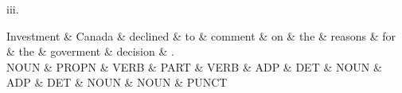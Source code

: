 iii. \\
\begin{center}
 {\small

 \begin{dependency}[] 
 \begin{deptext}
Investment \& Canada \& declined \& to \& comment \& on \& the \& reasons \& for \& the \& goverment \& decision \& . \\
NOUN \& PROPN \& VERB \& PART \& VERB \& ADP \& DET \& NOUN \& ADP \& DET \& NOUN \& NOUN \& PUNCT \\
\end{deptext}
\end{dependency}

 }
 \end{center}

